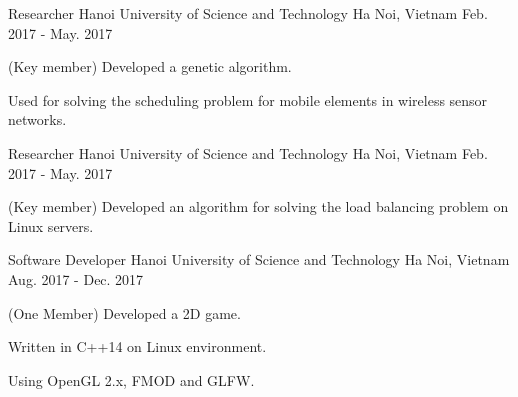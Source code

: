 


\begin{cventries}


\cventry
{Researcher} %
{Hanoi University of Science and Technology} %
{Ha Noi, Vietnam} %
{Feb. 2017 - May. 2017} %
{ %
\begin{cvitems}
\item{(Key member) Developed a genetic algorithm.}
\item{Used for solving the scheduling problem for mobile elements in wireless sensor networks.}
\end{cvitems}
}


\cventry
{Researcher} %
{Hanoi University of Science and Technology} %
{Ha Noi, Vietnam} %
{Feb. 2017 - May. 2017} %
{ %
\begin{cvitems}
\item {(Key member) Developed an algorithm for solving the load balancing problem on Linux servers.}
\end{cvitems}
}


\cventry
{Software Developer} %
{Hanoi University of Science and Technology} %
{Ha Noi, Vietnam} %
{Aug. 2017 - Dec. 2017} %
{ %
\begin{cvitems}
\item {(One Member) Developed a 2D game.}
\item{Written in C++14 on Linux environment.}
\item {Using OpenGL 2.x, FMOD and GLFW.} 
\end{cvitems}
}


\end{cventries}
